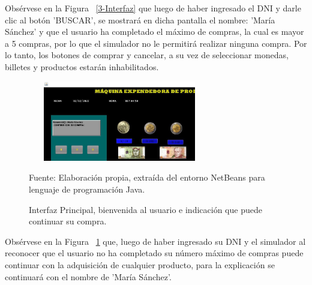 \documentclass[10pt,conference]{IEEEtran}
\begin{document}
Obsérvese en la Figura ~\ref{3-Interfaz} que luego de haber ingresado el DNI y darle clic al botón 'BUSCAR', se mostrará en dicha pantalla el nombre: 'María Sánchez' y que el usuario ha completado el máximo de compras, la cual es mayor a 5 compras, por lo que el simulador no le permitirá realizar ninguna compra. Por lo tanto, los botones de comprar y cancelar, a su vez de seleccionar monedas, billetes y productos estarán inhabilitados.

\begin{figure}[H]
    \begin{center}
    \includegraphics[width=8cm, height=3.5cm]{Resultados/4-Interfaz.JPG}
    \centering
    \caption{Interfaz Principal, bienvenida al usuario e indicación que puede continuar su compra.}
    \label{4-Interfaz} 
    \vspace{1.5 mm}
    {\small Fuente: Elaboración propia, extraída del entorno NetBeans para lenguaje de programación Java.}
    \end{center}
\end{figure}

Obsérvese en la Figura ~\ref{4-Interfaz} que, luego de haber ingresado su DNI y el simulador al reconocer que el usuario no ha completado su número máximo de compras puede continuar con la adquisición de cualquier producto, para la explicación se continuará con el nombre de 'María Sánchez'.
\end{document}
